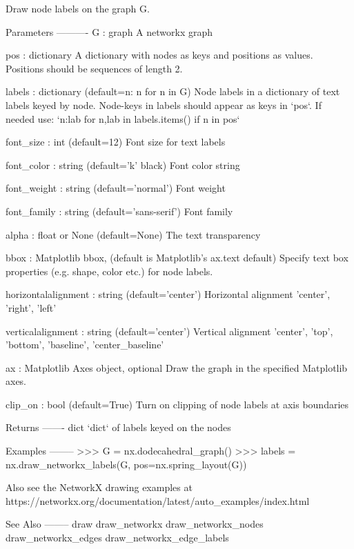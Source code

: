 \begin{DoxyVerb}Draw node labels on the graph G.

Parameters
----------
G : graph
    A networkx graph

pos : dictionary
    A dictionary with nodes as keys and positions as values.
    Positions should be sequences of length 2.

labels : dictionary (default={n: n for n in G})
    Node labels in a dictionary of text labels keyed by node.
    Node-keys in labels should appear as keys in `pos`.
    If needed use: `{n:lab for n,lab in labels.items() if n in pos}`

font_size : int (default=12)
    Font size for text labels

font_color : string (default='k' black)
    Font color string

font_weight : string (default='normal')
    Font weight

font_family : string (default='sans-serif')
    Font family

alpha : float or None (default=None)
    The text transparency

bbox : Matplotlib bbox, (default is Matplotlib's ax.text default)
    Specify text box properties (e.g. shape, color etc.) for node labels.

horizontalalignment : string (default='center')
    Horizontal alignment {'center', 'right', 'left'}

verticalalignment : string (default='center')
    Vertical alignment {'center', 'top', 'bottom', 'baseline', 'center_baseline'}

ax : Matplotlib Axes object, optional
    Draw the graph in the specified Matplotlib axes.

clip_on : bool (default=True)
    Turn on clipping of node labels at axis boundaries

Returns
-------
dict
    `dict` of labels keyed on the nodes

Examples
--------
>>> G = nx.dodecahedral_graph()
>>> labels = nx.draw_networkx_labels(G, pos=nx.spring_layout(G))

Also see the NetworkX drawing examples at
https://networkx.org/documentation/latest/auto_examples/index.html

See Also
--------
draw
draw_networkx
draw_networkx_nodes
draw_networkx_edges
draw_networkx_edge_labels
\end{DoxyVerb}
 \mbox{\label{namespacenetworkx_1_1drawing_1_1nx__pylab_a3f26ea20c4799842a65c35f71f31adeb}} 

